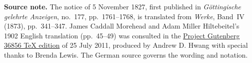 \par\medskip\begin{small}\noindent\textbf{Source note.} The notice of 5 November 1827, first published in \textit{Göttingische gelehrte Anzeigen}, no.~177, pp.~1761--1768, is translated from \textit{Werke}, Band~IV (1873), pp.~341--347. James Caddall Morehead and Adam Miller Hiltebeitel's 1902 English translation (pp.~45--49) was consulted in the \href{https://www.gutenberg.org/ebooks/36856}{Project Gutenberg 36856 TeX edition} of 25 July 2011, produced by Andrew D. Hwang with special thanks to Brenda Lewis. The German source governs the wording and notation.\par\end{small}
